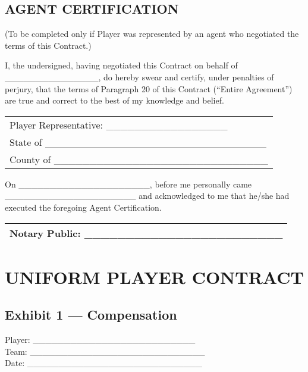 \documentclass[
]{book}
\begin{document}
\hypertarget{agent-certification}{%
\subsection{AGENT CERTIFICATION}\label{agent-certification}}

(To be completed only if Player was represented by an agent who negotiated the terms of this Contract.)

I, the undersigned, having negotiated this Contract on behalf of \_\_\_\_\_\_\_\_\_\_\_\_\_\_\_, do hereby swear and certify, under penalties of perjury, that the terms of Paragraph 20 of this Contract (``Entire Agreement'') are true and correct to the best of my knowledge and belief.

\begin{longtable}[]{@{}l@{}}
\toprule()
\endhead
Player Representative: \_\_\_\_\_\_\_\_\_\_\_\_\_\_\_\_\_ \\
State of \_\_\_\_\_\_\_\_\_\_\_\_\_\_\_\_\_\_\_\_\_\_\_\_\_\_\_\_\_\_\_ \\
County of \_\_\_\_\_\_\_\_\_\_\_\_\_\_\_\_\_\_\_\_\_\_\_\_\_\_\_\_\_\_ \\
\bottomrule()
\end{longtable}

On \_\_\_\_\_\_\_\_\_\_\_\_\_\_\_\_\_\_\_\_\_, before me personally came \_\_\_\_\_\_\_\_\_\_\_\_\_\_\_\_\_\_\_\_\_ and acknowledged to me that he/she had executed the foregoing Agent Certification.

\begin{longtable}[]{@{}l@{}}
\toprule()
\endhead
Notary Public: \_\_\_\_\_\_\_\_\_\_\_\_\_\_\_\_\_\_\_\_\_\_\_\_ \\
\bottomrule()
\end{longtable}

\newpage

\hypertarget{uniform-player-contract-1}{%
\section{UNIFORM PLAYER CONTRACT}\label{uniform-player-contract-1}}

\hypertarget{exhibit-1-compensation}{%
\subsection{Exhibit 1 --- Compensation}\label{exhibit-1-compensation}}

Player: \_\_\_\_\_\_\_\_\_\_\_\_\_\_\_\_\_\_\_\_\_\_\_\_\_\_\\
Team: \_\_\_\_\_\_\_\_\_\_\_\_\_\_\_\_\_\_\_\_\_\_\_\_\_\_\_\_\\
Date: \_\_\_\_\_\_\_\_\_\_\_\_\_\_\_\_\_\_\_\_\_\_\_\_\_\_\_\_
\end{document}
